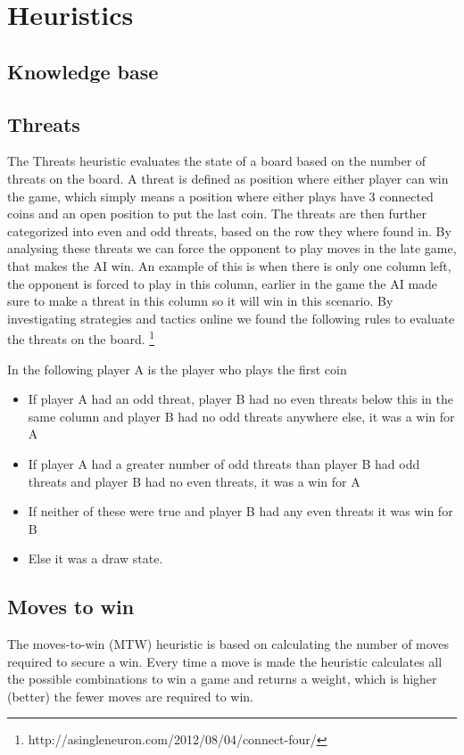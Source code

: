\documentclass[a4paper, titlepage]{article}
\begin{document}
\section*{Heuristics}
\subsection*{Knowledge base}


\subsection*{Threats}
The Threats heuristic evaluates the state of a board based on the number of
threats on the board. A threat is defined as position where either player can
win the game, which simply means a position where either plays have 3 connected
coins and an open position to put the last coin. The threats are then further
categorized into even and odd threats, based on the row they where found in. By
analysing these threats we can force the opponent to play moves in the late
game, that makes the AI win. An example of this is when there is only one column
left, the opponent is forced to play in this column, earlier in the game the AI
made sure to make a threat in this column so it will win in this scenario. By
investigating strategies and tactics online we found the following rules to
evaluate the threats on the board.
\footnote{http://asingleneuron.com/2012/08/04/connect-four/}

In the following player A is the player who plays the first coin
\begin{itemize} 
	\item If player A had an odd threat, player B had no even threats below this in the same column and player B had no odd threats anywhere else, it was a win for A
	\item If player A had a greater number of odd threats than player B had odd threats and player B had no even threats, it was a win for A	
	\item If neither of these were true and player B had any even threats it was win for B
	\item Else it was a draw state.
\end{itemize} 

\subsection*{Moves to win}
The moves-to-win (MTW) heuristic is based on calculating the number of moves required to 
secure a win. Every time a move is made the heuristic calculates all the possible 
combinations to win a game and returns a weight, which is higher (better) the fewer
moves are required to win. 
\end{document}
